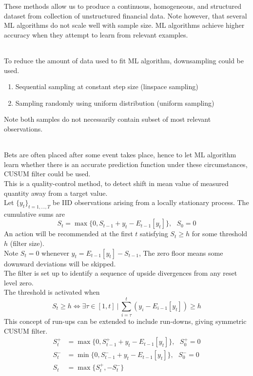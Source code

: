 These methods allow us to produce a continuous, homogeneous, and structured dataset from collection of unstructured financial data. Note however, that several ML algorithms do not scale well with sample size. ML algorithms achieve higher accuracy when they attempt to learn from relevant examples.

\begin{method} \\
To reduce the amount of data used to fit ML algorithm, downsampling could be used.
\begin{enumerate}[label=\roman*.]
\setlength{\itemsep}{0pt}
\item Sequential sampling at constant step size (linspace sampling)
\item Sampling randomly using uniform distribution (uniform sampling)
\end{enumerate}
Note both samples do not necessarily contain subset of most relevant observations.
\end{method}

\begin{method}  \\
Bets are often placed after some event takes place, hence to let ML algorithm learn whether there is an accurate prediction function under these circumstances, CUSUM filter could be used.\\
This is a quality-control method, to detect shift in mean value of measured quantity away from a target value.\\
Let $\{y_t\}_{t=1, \ldots, T}$ be IID observations arising from a locally stationary process. The cumulative sums are
\begin{equation}
S_t = \max \{0, S_{t-1} + y_t - E_{t-1} [y_t] \}, \ \ \ S_0 = 0 \nonumber
\end{equation}
An action will be recommended at the first $t$ satisfying $S_t \geq h$ for some threshold $h$ (filter size).\\
Note $S_t = 0$ whenever $y_t = E_{t-1}[y_t] - S_{t-1}$, The zero floor means some downward deviations will be skipped.\\
The filter is set up to identify a sequence of upside divergences from any reset level zero.\\
The threshold is activated when
\begin{equation}
S_t \geq h \Leftrightarrow \exists \tau \in [1, t] \ \vert \ \sum\limits_{i=\tau}^t (y_i - E_{i-1}[y_t]) \geq h \nonumber
\end{equation}
This concept of run-ups can be extended to include run-downs, giving symmetric CUSUM filter.
\begin{align}
S^+_t &= \max \{0, S^+_{t-1} + y_t - E_{t-1}[y_t] \}, \ \ \ S^+_0 = 0 \nonumber \\
S^-_t &= \min \{0, S^-_{t-1} + y_t - E_{t-1}[y_t] \}, \ \ \ S^-_0 = 0 \nonumber \\
S_t &= \max \{S^+_t, -S^-_t \} \nonumber
\end{align}
\end{method}